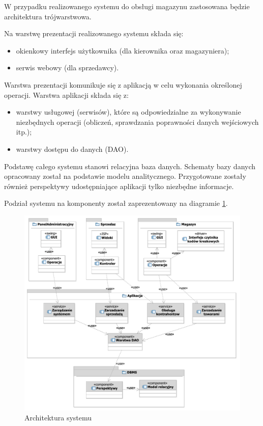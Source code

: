 W przypadku realizowanego systemu do obsługi magazynu zastosowana
będzie architektura trójwarstwowa.

Na warstwę prezentacji realizowanego systemu składa się:
\begin{itemize}
\item okienkowy interfejs użytkownika (dla kierownika oraz
  magazyniera);
\item serwis webowy (dla sprzedawcy).
\end{itemize}
Warstwa prezentacji komunikuje się z aplikacją w celu wykonania
określonej operacji. Warstwa aplikacji składa się z:
\begin{itemize}
\item warstwy usługowej (serwisów), które są odpowiedzialne za
  wykonywanie niezbędnych operacji (obliczeń, sprawdzania poprawności
  danych wejściowych itp.);
\item warstwy dostępu do danych (DAO).
\end{itemize}

Podstawę całego systemu stanowi relacyjna baza danych.  Schematy bazy
danych opracowany został na podstawie modelu
analitycznego. Przygotowane zostały również perspektywy udostępniające
aplikacji tylko niezbędne informacje.

Podział systemu na komponenty został zaprezentowany na diagramie
\ref{fig:Architektura}.

\begin{figure}[p]
  \begin{center}
    \includegraphics[scale=0.7]{../img/sys/Architektura.pdf}
  \end{center}
  \caption{Architektura systemu}
  \label{fig:Architektura}
\end{figure}
\FloatBarrier


